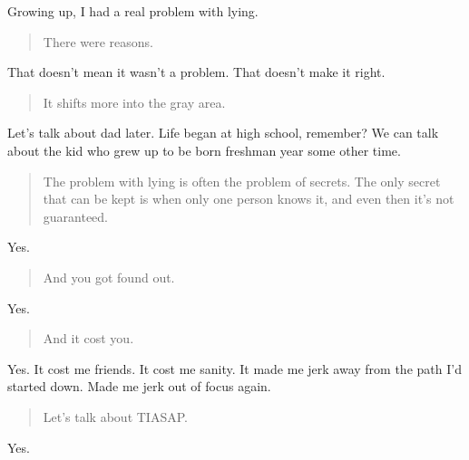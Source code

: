 Growing up, I had a real problem with lying.

\begin{quote}
There were reasons.
\end{quote}

That doesn't mean it wasn't a problem. That doesn't make it right.

\begin{quote}
It shifts more into the gray area.
\end{quote}

Let's talk about dad later. Life began at high school, remember? We can talk about the kid who grew up to be born freshman year some other time.

\begin{quote}
The problem with lying is often the problem of secrets. The only secret that can be kept is when only one person knows it, and even then it's not guaranteed.
\end{quote}

Yes.

\begin{quote}
And you got found out.
\end{quote}

Yes.

\begin{quote}
And it cost you.
\end{quote}

Yes. It cost me friends. It cost me sanity. It made me jerk away from the path I'd started down. Made me jerk out of focus again.

\begin{quote}
Let's talk about TIASAP.
\end{quote}

Yes.
